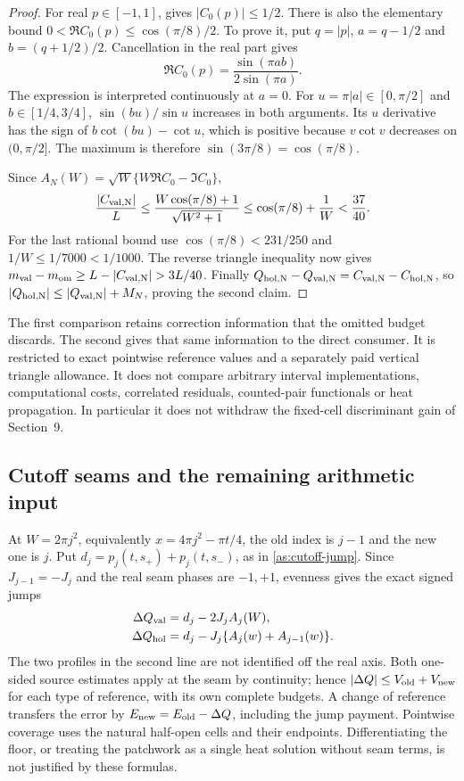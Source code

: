 \begin{proof}
For real $p\in[-1,1]$, \cite[(58)]{Polymath2019} gives $|C_0(p)|\le1/2$.
There is also the elementary bound
$0<\Re C_0(p)\le\cos(\pi/8)/2$. To prove it, put
$q=|p|$, $a=q-1/2$ and $b=(q+1/2)/2$. Cancellation in the real part gives
\[
 \Re C_0(p)=\frac{\sin(\pi ab)}{2\sin(\pi a)}.
\]
The expression is interpreted continuously at $a=0$.
For $u=\pi|a|\in[0,\pi/2]$ and $b\in[1/4,3/4]$,
$\sin(bu)/\sin u$ increases in both arguments. Its $u$ derivative has
the sign of $b\cot(bu)-\cot u$, which is positive because $v\cot v$
decreases on $(0,\pi/2]$. The maximum is therefore
$\sin(3\pi/8)=\cos(\pi/8)$.

Since $A_N(W)=\sqrt W\{W\Re C_0-\Im C_0\}$,
\[
 \frac{|C_{\rm val,N}|}{L}
 \le\frac{W\cos(\pi/8)+1}{\sqrt{W^2+1}}
 \le\cos(\pi/8)+\frac1W<\frac{37}{40}.
\]
For the last rational bound use $\cos(\pi/8)<231/250$ and
$1/W\le1/7000<1/1000$. The reverse triangle inequality now gives
$m_{\rm val}-m_{\rm om}\ge L-|C_{\rm val,N}|>3L/40$.
Finally $Q_{\rm hol,N}-Q_{\rm val,N}=C_{\rm val,N}-C_{\rm hol,N}$,
so $|Q_{\rm hol,N}|\le|Q_{\rm val,N}|+M_N$, proving the second claim.
\end{proof}

The first comparison retains correction information that the omitted
budget discards. The second gives that same information to the direct
consumer. It is restricted to exact pointwise reference values and a
separately paid vertical triangle allowance. It does not compare arbitrary
interval implementations, computational costs, correlated residuals,
counted-pair functionals or heat propagation. In particular it does not
withdraw the fixed-cell discriminant gain of Section~9.

\subsection{Cutoff seams and the remaining arithmetic input}

At $W=2\pi j^2$, equivalently $x=4\pi j^2-\pi t/4$, the old index is
$j-1$ and the new one is $j$. Put
$d_j=p_j(t,s_+)+p_j(t,s_-)$, as in \eqref{as:cutoff-jump}.
Since $J_{j-1}=-J_j$ and the real seam phases are $-1,+1$,
evenness gives the exact signed jumps
\begin{align}
 \Delta Q_{\rm val}&=d_j-2J_jA_j(W),\notag\\
 \Delta Q_{\rm hol}&=d_j-J_j\{A_j(w)+A_{j-1}(w)\}.
 \label{uc:seams}
\end{align}
The two profiles in the second line are not identified off the real axis.
Both one-sided source estimates apply at the seam by continuity; hence
$|\Delta Q|\le V_{\rm old}+V_{\rm new}$ for each type of reference,
with its own complete budgets. A change of reference transfers the error
by $E_{\rm new}=E_{\rm old}-\Delta Q$, including the jump payment.
Pointwise coverage uses the natural half-open cells and their endpoints.
Differentiating the floor, or treating the patchwork as a single heat
solution without seam terms, is not justified by these formulas.

